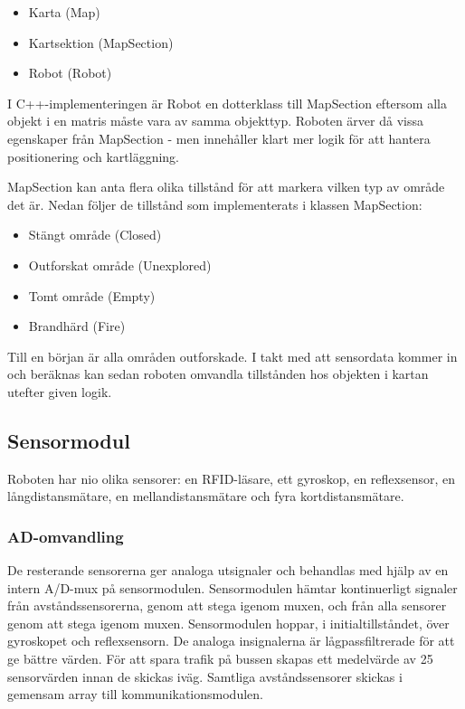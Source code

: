 \documentclass[a4paper,12pt,fleqn]{article}
\begin{document}
\begin{itemize}
	\item Karta (Map)
	\item Kartsektion (MapSection)
	\item Robot (Robot)
\end{itemize}

I C++-implementeringen är Robot en dotterklass till MapSection eftersom alla objekt i en matris måste vara av samma objekttyp. Roboten ärver då vissa egenskaper från MapSection - men innehåller klart mer logik för att hantera positionering och kartläggning. 

MapSection kan anta flera olika tillstånd för att markera vilken typ av område det är. Nedan följer de tillstånd som implementerats i klassen MapSection: 

\begin{itemize}
	\item Stängt område (Closed)
	\item Outforskat område (Unexplored)
	\item Tomt område (Empty)
	\item Brandhärd (Fire)
\end{itemize}

Till en början är alla områden outforskade. I takt med att sensordata kommer in och beräknas kan sedan roboten omvandla tillstånden hos objekten i kartan utefter given logik. 

\subsection{Sensormodul}

Roboten har nio olika sensorer: en RFID-läsare, ett gyroskop, en reflexsensor, en långdistansmätare, en mellandistansmätare och fyra kortdistansmätare. 

\subsubsection{AD-omvandling}
De resterande sensorerna ger analoga utsignaler och behandlas med hjälp av en intern A/D-mux på sensormodulen. 
Sensormodulen hämtar kontinuerligt signaler från avståndssensorerna, genom att stega igenom muxen, och från alla sensorer genom att stega igenom muxen. Sensormodulen hoppar, i initialtillståndet, över gyroskopet och reflexsensorn. De analoga insignalerna är lågpassfiltrerade för att ge bättre värden.
För att spara trafik på bussen skapas ett medelvärde av 25 sensorvärden innan de skickas iväg. Samtliga avståndssensorer skickas i gemensam array till kommunikationsmodulen.
\end{document}
